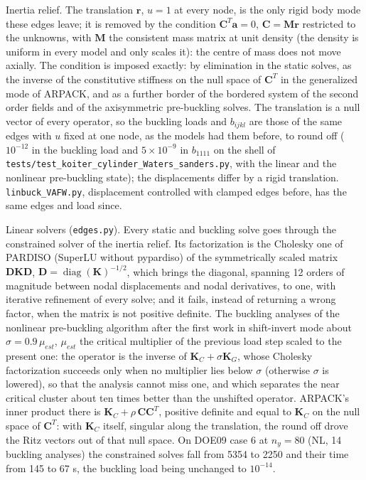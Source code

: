 \documentclass[11pt,a4paper]{article}
\begin{document}
Inertia relief.  The translation $\boldsymbol{r}$, $u = 1$ at every node,
is the only rigid body mode these edges leave; it is removed by the
condition $\boldsymbol{C}^T\boldsymbol{a} = 0$, $\boldsymbol{C} =
\boldsymbol{M}\boldsymbol{r}$ restricted to the unknowns, with
$\boldsymbol{M}$ the consistent mass matrix at unit density (the density is
uniform in every model and only scales it): the centre of mass does not move
axially.  The condition is imposed exactly: by elimination in the static
solves, as the inverse of the constitutive stiffness on the null space of
$\boldsymbol{C}^T$ in the generalized mode of ARPACK, and as a further
border of the bordered system of the second order fields and of the
axisymmetric pre-buckling solves.  The translation is a null vector of every
operator, so the buckling loads and $b_{ijkl}$ are those of the same edges
with $u$ fixed at one node, as the models had them before, to round off
($10^{-12}$ in the buckling load and $5\times10^{-9}$ in $b_{1111}$ on the
shell of \texttt{tests/test\_koiter\_cylinder\_Waters\_sanders.py}, with the
linear and the nonlinear pre-buckling state); the displacements differ by a
rigid translation.  \texttt{linbuck\_VAFW.py}, displacement controlled with
clamped edges before, has the same edges and load since.

Linear solvers (\texttt{edges.py}).  Every static and buckling solve goes
through the constrained solver of the inertia relief.  Its factorization is
the Cholesky one of PARDISO (SuperLU without pypardiso) of the symmetrically
scaled matrix $\boldsymbol{D}\boldsymbol{K}\boldsymbol{D}$,
$\boldsymbol{D} = \operatorname{diag}(\boldsymbol{K})^{-1/2}$, which brings
the diagonal, spanning 12 orders of magnitude between nodal displacements
and nodal derivatives, to one, with iterative refinement of every solve;
and it fails, instead of returning a wrong factor, when the matrix is not
positive definite.  The buckling analyses of the nonlinear pre-buckling
algorithm after the first work in shift-invert mode about $\sigma = 0.9\,
\mu_{est}$, $\mu_{est}$ the critical multiplier of the previous load step
scaled to the present one: the operator is the inverse of
$\boldsymbol{K}_C + \sigma\boldsymbol{K}_G$, whose Cholesky factorization
succeeds only when no multiplier lies below $\sigma$ (otherwise $\sigma$ is
lowered), so that the analysis cannot miss one, and which separates the
near critical cluster about ten times better than the unshifted operator.
ARPACK's inner product there is $\boldsymbol{K}_C + \rho\,\boldsymbol{C}
\boldsymbol{C}^T$, positive definite and equal to $\boldsymbol{K}_C$ on the
null space of $\boldsymbol{C}^T$: with $\boldsymbol{K}_C$ itself, singular
along the translation, the round off drove the Ritz vectors out of that
null space.  On DOE09 case 6 at $n_y = 80$ (NL, 14 buckling analyses) the
constrained solves fall from 5354 to 2250 and their time from 145 to 67 s,
the buckling load being unchanged to $10^{-14}$.
\end{document}
